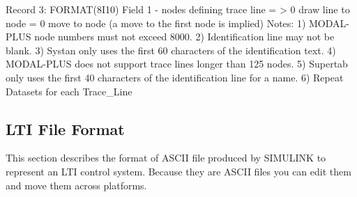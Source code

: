 \documentclass[10pt,openany,twoside]{book}
\numberwithin{equation}{section}   %
\begin{document}
\begin{example}
             Record 3: FORMAT(8I10)
                       Field 1 -    nodes defining trace line
                               =    > 0 draw line to node
                               =    0 move to node (a move to the first
                                    node is implied)
             Notes: 1) MODAL-PLUS node numbers must not exceed 8000.
                    2) Identification line may not be blank.
                    3) Systan only uses the first 60 characters of the
                       identification text.
                    4) MODAL-PLUS does not support trace lines longer than
                       125 nodes.
                    5) Supertab only uses the first 40 characters of the
                       identification line for a name.
                    6) Repeat Datasets for each Trace_Line

\end{example}

\subsection{LTI File Format}\label{sect:LTI-file}
This section describes the format of ASCII file produced by SIMULINK
to represent an LTI control system.
Because they are ASCII files
you can edit them and move them across platforms.
\end{document}
